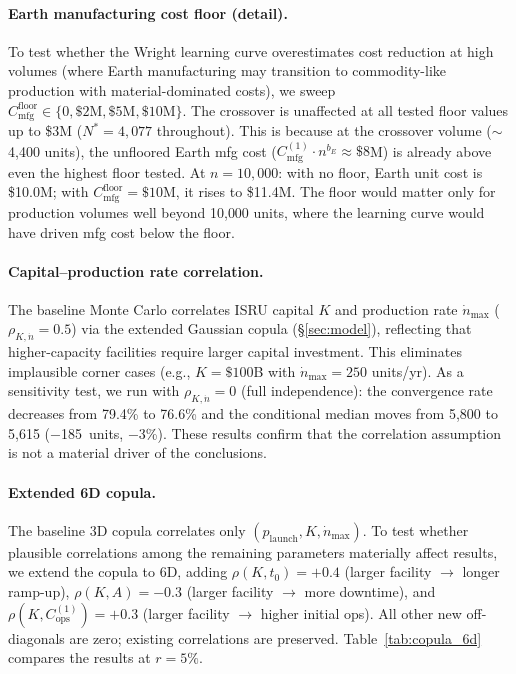 \documentclass[preprint,12pt]{elsarticle}
\begin{document}
\paragraph{Earth manufacturing cost floor (detail).} To test whether the Wright learning curve overestimates cost reduction at high volumes (where Earth manufacturing may transition to commodity-like production with material-dominated costs), we sweep $C_{\mathrm{mfg}}^{\mathrm{floor}} \in \{0, \$2\text{M}, \$5\text{M}, \$10\text{M}\}$. The crossover is unaffected at all tested floor values up to \$3M ($N^* = 4{,}077$ throughout). This is because at the crossover volume ($\sim$4{,}400 units), the unfloored Earth mfg cost ($C_{\mathrm{mfg}}^{(1)} \cdot n^{b_E} \approx \$8$M) is already above even the highest floor tested. At $n = 10{,}000$: with no floor, Earth unit cost is \$10.0M; with $C_{\mathrm{mfg}}^{\mathrm{floor}} = \$10$M, it rises to \$11.4M. The floor would matter only for production volumes well beyond 10{,}000 units, where the learning curve would have driven mfg cost below the floor.

\paragraph{Capital--production rate correlation.} The baseline Monte Carlo correlates ISRU capital $K$ and production rate $\dot{n}_{\max}$ ($\rho_{K,\dot{n}} = 0.5$) via the extended Gaussian copula (\S\ref{sec:model}), reflecting that higher-capacity facilities require larger capital investment. This eliminates implausible corner cases (e.g., $K = \$100$B with $\dot{n}_{\max} = 250$ units/yr). As a sensitivity test, we run with $\rho_{K,\dot{n}} = 0$ (full independence): the convergence rate decreases from 79.4\% to 76.6\% and the conditional median moves from 5{,}800 to 5{,}615 ($-$185~units, $-$3\%). These results confirm that the correlation assumption is not a material driver of the conclusions.

\paragraph{Extended 6D copula.} The baseline 3D copula correlates only $(p_{\mathrm{launch}}, K, \dot{n}_{\max})$. To test whether plausible correlations among the remaining parameters materially affect results, we extend the copula to 6D, adding $\rho(K, t_0) = +0.4$ (larger facility $\to$ longer ramp-up), $\rho(K, A) = -0.3$ (larger facility $\to$ more downtime), and $\rho(K, C_{\mathrm{ops}}^{(1)}) = +0.3$ (larger facility $\to$ higher initial ops). All other new off-diagonals are zero; existing correlations are preserved. Table~\ref{tab:copula_6d} compares the results at $r = 5\%$.
\end{document}
